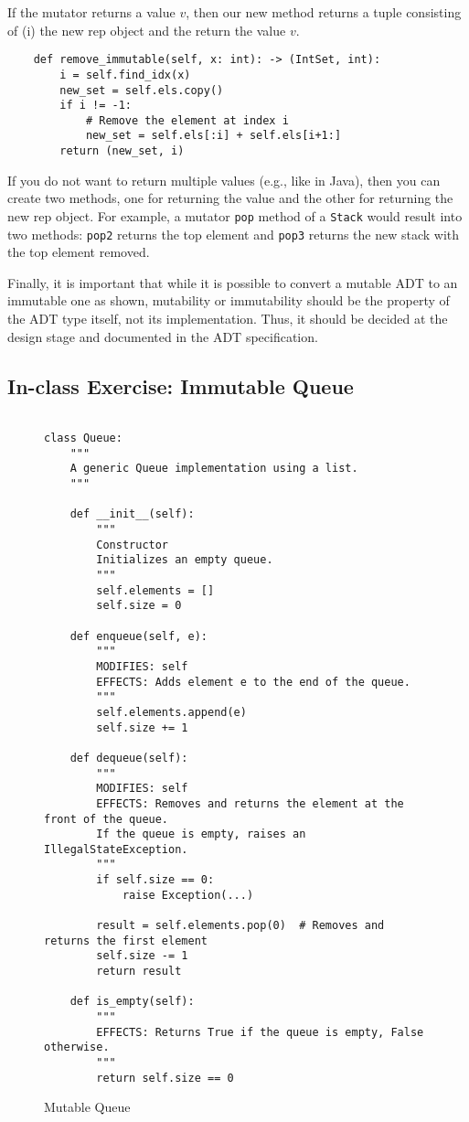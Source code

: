 \documentclass[oneside,11pt,dvipsnames]{book}
\newcommand{\code}[1]{\texttt{#1}}
\begin{document}
If the mutator returns a value $v$, then our new method returns a tuple consisting of (i) the new rep object and the return the value $v$. 
\begin{lstlisting}
    def remove_immutable(self, x: int): -> (IntSet, int):
        i = self.find_idx(x)
        new_set = self.els.copy()
        if i != -1:
            # Remove the element at index i
            new_set = self.els[:i] + self.els[i+1:]  
        return (new_set, i)
\end{lstlisting}

If you do not want to return multiple values (e.g., like in Java), then you can create two methods, one for returning the value and the other for returning the new rep object.
For example, a mutator \code{pop} method of a \code{Stack} would result into two methods: \code{pop2} returns the top element and \code{pop3} returns the new stack with the top element removed.

Finally, it is important that while it is possible to convert a mutable ADT to an immutable one as shown, mutability or immutability should be the property of the ADT type itself, not its implementation. Thus, it should be decided at the design stage and documented in the ADT specification.

\subsection{In-class Exercise: Immutable Queue}\label{ic:immutable-queue}

\begin{figure}
    \begin{lstlisting}

class Queue:
    """
    A generic Queue implementation using a list.
    """

    def __init__(self):
        """
        Constructor
        Initializes an empty queue.
        """
        self.elements = []
        self.size = 0

    def enqueue(self, e):
        """
        MODIFIES: self
        EFFECTS: Adds element e to the end of the queue.
        """
        self.elements.append(e)
        self.size += 1

    def dequeue(self):
        """
        MODIFIES: self
        EFFECTS: Removes and returns the element at the front of the queue.
        If the queue is empty, raises an IllegalStateException.
        """
        if self.size == 0:
            raise Exception(...)

        result = self.elements.pop(0)  # Removes and returns the first element
        self.size -= 1
        return result

    def is_empty(self):
        """
        EFFECTS: Returns True if the queue is empty, False otherwise.
        """
        return self.size == 0

    \end{lstlisting}
    \caption{Mutable Queue}\label{ex:mutable-queue}
\end{figure}
\end{document}
